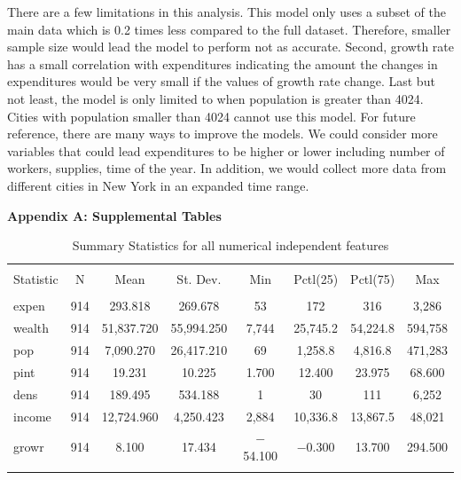\documentclass[11pt]{article}\usepackage[]{graphicx}\usepackage[]{color}
\begin{document}
\noindent There are a few limitations in this analysis. This model only uses a subset of the main data which is 0.2 times less compared to the full dataset. Therefore, smaller sample size would lead the model to perform not as accurate. Second, growth rate has a small correlation with expenditures indicating the amount the changes in expenditures would be very small if the values of growth rate change. Last but not least, the model is only limited to when population is greater than 4024. Cities with population smaller than 4024 cannot use this model. For future reference, there are many ways to improve the models. We could consider more variables that could lead expenditures to be higher or lower including number of workers, supplies, time of the year. In addition, we would collect more data from different cities in New York in an expanded time range.    
\hfill \break

\clearpage
\newpage
\noindent \Large{{\bf Appendix A: Supplemental Tables}}

\begin{center}

\begin{table}[H] \centering 
  \caption{Summary Statistics for all numerical independent features} 
  \label{descrips} 
\begin{tabular}{@{\extracolsep{5pt}}lccccccc} 
\\[-1.8ex]\hline 
\hline \\[-1.8ex] 
Statistic & \multicolumn{1}{c}{N} & \multicolumn{1}{c}{Mean} & \multicolumn{1}{c}{St. Dev.} & \multicolumn{1}{c}{Min} & \multicolumn{1}{c}{Pctl(25)} & \multicolumn{1}{c}{Pctl(75)} & \multicolumn{1}{c}{Max} \\ 
\hline \\[-1.8ex] 
expen & 914 & 293.818 & 269.678 & 53 & 172 & 316 & 3,286 \\ 
wealth & 914 & 51,837.720 & 55,994.250 & 7,744 & 25,745.2 & 54,224.8 & 594,758 \\ 
pop & 914 & 7,090.270 & 26,417.210 & 69 & 1,258.8 & 4,816.8 & 471,283 \\ 
pint & 914 & 19.231 & 10.225 & 1.700 & 12.400 & 23.975 & 68.600 \\ 
dens & 914 & 189.495 & 534.188 & 1 & 30 & 111 & 6,252 \\ 
income & 914 & 12,724.960 & 4,250.423 & 2,884 & 10,336.8 & 13,867.5 & 48,021 \\ 
growr & 914 & 8.100 & 17.434 & $-$54.100 & $-$0.300 & 13.700 & 294.500 \\ 
\hline \\[-1.8ex] 
\end{tabular} 
\end{table} 

\end{center} 
\end{document}
